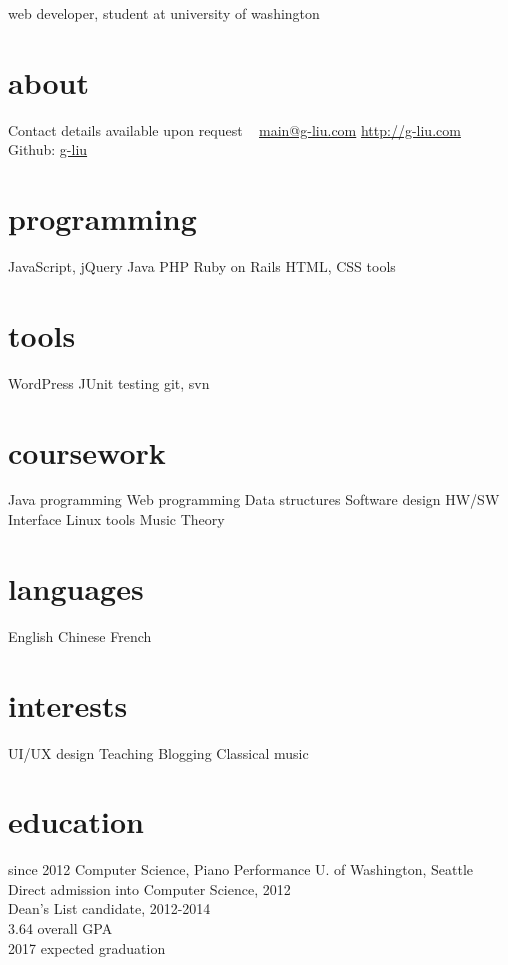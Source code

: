 \documentclass[]{friggeri-cv}
\begin{document}
       {web developer, student at university of washington}

\begin{aside}
  \section{about}
    Contact details available upon request
    ~
    \href{mailto:main@g-liu.com}{main@g-liu.com}
    \href{http://g-liu.com}{http://g-liu.com}
    Github: \href{http://github.com/g-liu}{g-liu}
  \section{programming}
  	JavaScript, jQuery
  	Java
  	PHP
  	Ruby on Rails
    HTML, CSS tools
  \section{tools}
    WordPress
    JUnit testing
    git, svn
  \section{coursework}
    Java programming
    Web programming
    Data structures
    Software design
    HW/SW Interface
    Linux tools
    Music Theory
  \section{languages}
    English
    Chinese
    French
  \section{interests}
    UI/UX design
    Teaching
    Blogging
    Classical music
\end{aside}

\section{education}

\begin{entrylist}
  \entry
    {since 2012}
    {Computer Science, Piano Performance}
    {U. of Washington, Seattle}
    {Direct admission into Computer Science, 2012 \\
    Dean's List candidate, 2012-2014 \\
    3.64 overall GPA \\
    2017 expected graduation}
\end{entrylist}
\end{document}
